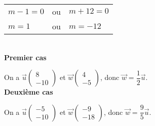 \begin{tabular}{lll}
$ m-1 = 0$ & ou & $m+12 = 0$ \\
$m = 1$ & ou & $ m = -12 $ \\
\end{tabular}\\

\textbf{Premier cas}

On a $\vec{u}\left(\begin{array}{c} 8\\ -10 \end{array}\right)$ et $\overrightarrow{w}\left(\begin{array}{c} 4\\ -5 \end{array}\right)$, donc $\overrightarrow{w} = \dfrac{1}{2} \vec{u}$.\\

\textbf{Deuxième cas}

On a $\vec{u}\left(\begin{array}{c} -5\\ -10 \end{array}\right)$ et $\overrightarrow{w}\left(\begin{array}{c} -9\\ -18 \end{array}\right)$, donc $\overrightarrow{w} = \dfrac{9}{5} \vec{u}$.
